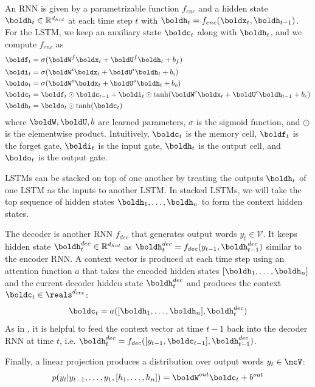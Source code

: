 \documentclass[12pt]{report}
\begin{document}
An RNN is given by a parametrizable function $f_{enc}$ and a hidden state $\boldh_t \in \mathbb{R}^{ d_{hid}}$ at each time step $t$ with $\boldh_t = f_{enc}(\boldx_t, \boldh_{t-1})$. For the LSTM, we keep an auxiliary state $\boldc_t$ along with $\boldh_t$, and we compute $f_{enc}$ as
\begin{align}
\boldf_t &= \sigma(\boldW^f \boldx_t + \boldU^f \boldh_t + b_f) \\
\boldi_t &= \sigma(\boldW^i \boldx_t + \boldU^i \boldh_t + b_i) \\
\boldo_t &= \sigma(\boldW^o \boldx_t + \boldU^o \boldh_t + b_o) \\
\boldc_t &= \boldf_t \odot \boldc_{t-1}  + \boldi_t \odot \tanh(\boldW^c \boldx_t + \boldU^c \boldh_{t-1} + b_c) \\
\boldh_t &= \boldo_t \odot \tanh(\boldc_t)
\end{align}
where $\boldW, \boldU, b$ are learned parameters, $\sigma$ is the sigmoid function, and $\odot$ is the elementwise product. 
Intuitively, $\boldc_t$ is the memory cell, $\boldf_t$ is the forget gate, $\boldi_t$ is the input gate, $\boldh_t$ is the output cell, and $\boldo_t$ is the output gate.

LSTMs can be stacked on top of one another by treating the outputs $\boldh_t$ of one LSTM as the inputs to another LSTM. In stacked LSTMs, we will take the top sequence of hidden states $\boldh_1, \ldots, \boldh_n$ to form the context hidden states.


The decoder is another RNN $f_{dec}$ that generates output words $y_t \in \mathcal{V}$. It keeps hidden state $\boldh_t^{dec} \in \mathbb{R}^{d_{hid}}$ as $\boldh_t^{dec} = f_{dec}(y_{t-1}, \boldh_{t-1}^{dec})$ similar to the encoder RNN.
A context vector is produced at each time step using an attention function $a$ that takes the encoded hidden states $[\boldh_1, \ldots, \boldh_n]$ and the current decoder hidden state $\boldh_t^{dec}$ and produces the context $\boldc_t \in \reals^{d_{ctx}}$:
\begin{equation}
\boldc_t = a([\boldh_1, \ldots, \boldh_n], \boldh_t^{dec})
\end{equation}
As in \citet{luong2015effective}, it is helpful to feed the context vector at time $t-1$ back into the decoder RNN at time $t$, i.e. $\boldh_t^{dec} = f_{dec}([y_{t-1}, \boldc_{t-1}], \boldh_{t-1}^{dec})$.

Finally, a linear projection produces a distribution over output words $y_t \in \mcV$:
\begin{equation}
p(y_t | y_{t-1}, \ldots, y_1, [h_1, \ldots, h_n]) = \boldW^{out}\boldc_t + b^{out}
\end{equation}
\end{document}
